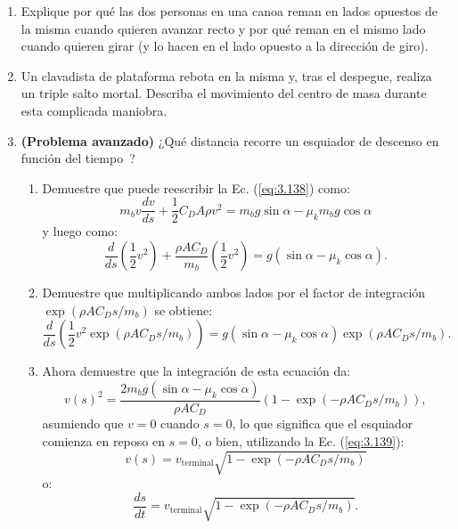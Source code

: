 \documentclass[12pt]{book}
\begin{document}
\begin{enumerate}
\item[3.64] Explique por qué las dos personas en una canoa reman en lados opuestos de la misma cuando quieren avanzar recto y por qué reman en el mismo lado cuando quieren girar (y lo hacen en el lado opuesto a la dirección de giro).

\item[3.65] Un clavadista de plataforma rebota en la misma y, tras el despegue, realiza un triple salto mortal. Describa el movimiento del centro de masa durante esta complicada maniobra.

\item[3.66] \textbf{(Problema avanzado)} ¿Qué distancia recorre un esquiador de descenso en función del tiempo~\cite{ref135}?
\begin{enumerate}
\item[(a)] Demuestre que puede reescribir la Ec. (\ref{eq:3.138}) como:
\begin{equation}
m_b v \frac{dv}{ds} + \frac{1}{2} C_D A \rho v^2 = m_b g \sin \alpha - \mu_k m_b g \cos \alpha
\label{eq:3.158}
\end{equation}
y luego como:
\begin{equation}
\frac{d}{ds} \left( \frac{1}{2} v^2 \right) + \frac{\rho A C_D}{m_b} \left( \frac{1}{2} v^2 \right) = g(\sin \alpha - \mu_k \cos \alpha).
\label{eq:3.159}
\end{equation}
\item[(b)] Demuestre que multiplicando ambos lados por el factor de integración $\exp(\rho A C_D s / m_b)$ se obtiene:
\begin{equation}
\frac{d}{ds} \left( \frac{1}{2} v^2 \exp(\rho A C_D s / m_b) \right) = g(\sin \alpha - \mu_k \cos \alpha) \exp(\rho A C_D s / m_b).
\label{eq:3.160}
\end{equation}
\item[(c)] Ahora demuestre que la integración de esta ecuación da:
\begin{equation}
v(s)^2 = \frac{2 m_b g (\sin \alpha - \mu_k \cos \alpha)}{\rho A C_D} \left(1 - \exp(-\rho A C_D s / m_b)\right),
\label{eq:3.161}
\end{equation}
asumiendo que $v = 0$ cuando $s = 0$, lo que significa que el esquiador comienza en reposo en $s = 0$, o bien, utilizando la Ec. (\ref{eq:3.139}):
\begin{equation}
v(s) = v_{\text{terminal}} \sqrt{1 - \exp(-\rho A C_D s / m_b)}
\label{eq:3.162}
\end{equation}
o:
\begin{equation}
\frac{ds}{dt} = v_{\text{terminal}} \sqrt{1 - \exp(-\rho A C_D s / m_b)}.

\end{equation}
\end{enumerate}
\end{enumerate}
\end{document}
